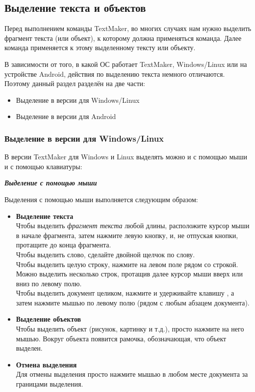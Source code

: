 ﻿\documentclass[a4paper,10pt]{article}
\begin{document}
\subsection{Выделение текста и объектов} \label{sec:выделтекстаиобъект}
Перед выполнением команды TextMaker, во многих случаях нам нужно выделить фрагмент текста (или объект), к которому должна применяться команда. Далее команда применяется к этому выделенному тексту или объекту.

В зависимости от того, в какой ОС работает TextMaker, Windows/Linux или на устройстве Android, действия по выделению текста немного отличаются. Поэтому данный раздел разделён на две части:
\begin{itemize}
 \item Выделение в версии для Windows/Linux
 \item Выделение в версии для Android
\end{itemize}

\subsubsection{Выделение в версии для Windows/Linux}
В версии TextMaker для Windows и Linux выделять можно и с помощью мыши и с помощью клавиатуры:

\textbf{\textit{Выделение с помощью мыши}}

Выделения  с помощью мыши выполняется следующим образом:
\begin{itemize}
 \item \textbf{Выделение текста}\\
 Чтобы выделить \textit{фрагмент текста} любой длины, расположите курсор мыши в начале фрагмента, затем нажмите левую кнопку, и, не отпуская кнопки, протащите до конца фрагмента.\\
Чтобы выделить слово, сделайте двойной щелчок по слову.\\
Чтобы выделить целую строку, нажмите на левом поле рядом со строкой. Можно выделить несколько строк, протащив далее курсор мыши вверх или вниз по левому полю.\\
Чтобы выделить документ целиком, нажмите и удерживайте клавишу , а затем нажмите мышью по левому полю (рядом с любым абзацем документа).
\item \textbf{Выделение объектов}\\
Чтобы выделить объект (рисунок, картинку и т.д.), просто нажмите на него мышью. Вокруг объекта появится рамочка, обозначающая, что объект выделен.
\item \textbf{Отмена выделения}\\
Для отмены выделения просто нажмите мышью в любом месте документа за границами выделения.
\end{itemize}
\end{document}
